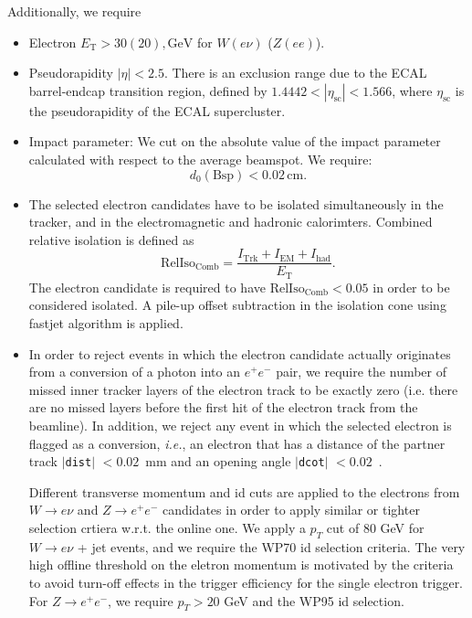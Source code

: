 Additionally, we require
\begin{itemize}
\item Electron $E_\mathrm{T} > 30 (20),\mathrm{GeV}$ for $W(e\nu)$ ($Z(ee)$).
\item Pseudorapidity $|\eta| < 2.5$. There is an exclusion range due
        to the ECAL barrel-endcap transition region, defined by
        $1.4442 < |\eta_{\mathrm{sc}}| < 1.566$, where
        $\eta_{\mathrm{sc}}$ is the pseudorapidity of the ECAL
        supercluster.
\item Impact parameter: We cut on the absolute value of the impact
       parameter calculated with respect to the average beamspot. We
       require:
\begin{equation*}
 d_0(\mathrm{Bsp}) < 0.02\,\mathrm{cm}.    
\end{equation*}
\item The selected electron candidates have to be isolated simultaneously in
the tracker, and in the electromagnetic and hadronic calorimters.  Combined
relative isolation is defined as
\begin{equation*}
\mathrm{RelIso_{\mathrm{Comb}}} = \frac{I_{\mathrm{Trk}}+I_{\mathrm{EM}}+I_{\mathrm{had}}}{E_\mathrm{T}}.
\end{equation*} 
The electron candidate is required to have 
$\mathrm{RelIso_{\mathrm{Comb}}} < 0.05$ in order 
to be considered isolated. 
A pile-up offset subtraction in the isolation cone 
using fastjet algorithm \cite{FastJetPUSubtraction} is applied.
\item 
In order to reject events in which the electron candidate actually
originates from a conversion of a photon into an $e^{+}e^{-}$ pair, we
require the number of missed inner tracker layers of the electron
track to be exactly zero (i.e. there are no missed layers before the
first hit of the electron track from the beamline). In addition, we
reject any event in which the selected electron is flagged as a
conversion, \textit{i.e.}, an electron that has a 
distance of the partner track $|$\texttt{dist}$|$ $< 0.02$~mm and an
opening angle $|$\texttt{dcot}$|$ $< 0.02$~\cite{ConversionRejection}.

Different transverse momentum and id cuts are applied to the electrons from $W \to e\nu$ and $Z \to e^+e^-$ candidates in order to apply similar or tighter selection crtiera w.r.t. the online one. 
We apply a $p_T$ cut of 80 GeV for $W \to e\nu$ + jet events, and we require the WP70 id selection criteria. 
 The very high offline threshold on the eletron momentum is motivated by the criteria to avoid turn-off effects in the trigger efficiency for the single electron trigger. 
For $Z \to e^+e^-$, we require $p_T>20 $ GeV and the WP95 id selection.   

\end{itemize}
